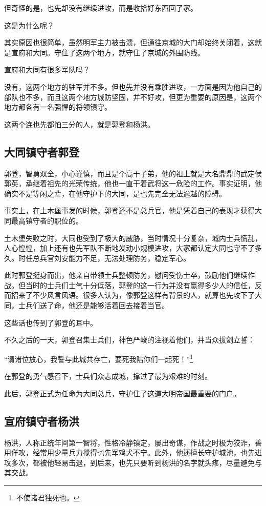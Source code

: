 \begin{multicols}{\theparacolNo}
但奇怪的是，也先却没有继续进攻，而是收拾好东西回了家。

这是为什么呢？

其实原因也很简单，虽然明军主力被击溃，但通往京城的大门却始终关闭着，这就是宣府和大同。守住了这两个地方，就守住了京城的外围防线。

宣府和大同有很多军队吗？

没有，这两个地方的驻军并不多。但也先并没有乘胜进攻，一方面是因为他自己的部队也不多，而且这两个地方城防坚固，并不好攻，但更为重要的原因是，这两个地方都各有一名强悍的将领镇守。

这两个连也先都怕三分的人，就是郭登和杨洪。

\subsection{大同镇守者郭登}
郭登，智勇双全，小心谨慎，而且是个高干子弟，他的祖上就是大名鼎鼎的武定侯郭英，承继着祖先的光荣传统，他也一直干着武将这一危险的工作。事实证明，他确实不是等闲之辈，在他守护下的大同，是也先完全无法逾越的障碍。

事实上，在土木堡事发的时候，郭登还不是总兵官，他是凭着自己的表现才获得大同最高镇守者的职位的。

土木堡失败之时，大同也受到了极大的威胁，当时情况十分复杂，城内士兵慌乱，人心惶惶，加上还有也先军队不断地发动小规模进攻，大家都认定大同也守不了多久。时任总兵官刘安能力不足，无法处理防务，稳定军心。

此时郭登挺身而出，他亲自带领士兵整顿防务，慰问受伤士卒，鼓励他们继续作战。但当时的士兵们士气十分低落，郭登的这一行为并没有赢得多少人的信任，反而招来了不少风言风语。很多人认为，像郭登这样有背景的人，就算也先攻下了大同，士兵们送了命，他还是能够活着回去接着当官。

这些话也传到了郭登的耳中。

不久之后的一天，郭登召集士兵们，神色严峻的注视着他们，并当众拔剑立誓：

“请诸位放心，我誓与此城共存亡，要死我陪你们一起死！”\footnote{不使诸君独死也。}

在郭登的勇气感召下，士兵们众志成城，撑过了最为艰难的时刻。

此后，郭登正式为任命为大同总兵，守护住了这道大明帝国最重要的门户。

\subsection{宣府镇守者杨洪}
杨洪，人称正统年间第一智将，性格冷静镇定，屡出奇谋，作战之时极为狡诈，善用佯攻，经常用少量兵力搅得也先军鸡犬不宁。此外，他还擅长守护城池，也先进攻多次，都被他轻易击退，到后来，也先只要听到杨洪的名字就头疼，尽量避免与其交战。


\end{multicols}
